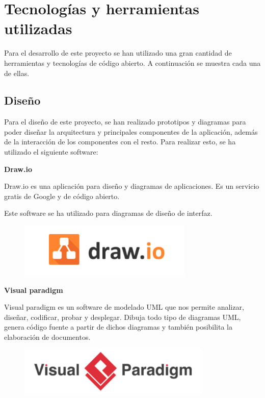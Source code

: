 


\pagestyle{miEstilo4}

\section{Tecnologías y herramientas utilizadas}

Para el desarrollo de este proyecto se han utilizado una gran cantidad de herramientas y tecnologías de código abierto. A continuación se muestra cada una de ellas.

\subsection{Diseño}

Para el diseño de este proyecto, se han realizado prototipos y diagramas para poder diseñar la arquitectura y principales componentes de la aplicación, además de la interacción de los componentes con el resto. Para realizar esto, se ha utilizado el siguiente software:

\textbf{Draw.io}

Draw.io \cite{ref7} es una aplicación para diseño y diagramas de aplicaciones. Es un servicio gratis de Google y de código abierto.

Este software se ha utilizado para diagramas de diseño de interfaz.

\begin{figure}[h]
	\centering
	\includegraphics[scale=0.5]{images/4}
\end{figure}

\textbf{Visual paradigm} 

Visual paradigm \cite{ref8}  es un software de modelado UML que nos permite analizar, diseñar,
codificar, probar y desplegar. Dibuja todo tipo de diagramas UML, genera código fuente a
partir de dichos diagramas y también posibilita la elaboración de documentos.


\begin{figure}[h]
	\centering
	\includegraphics[scale=0.5]{images/5}
\end{figure}

